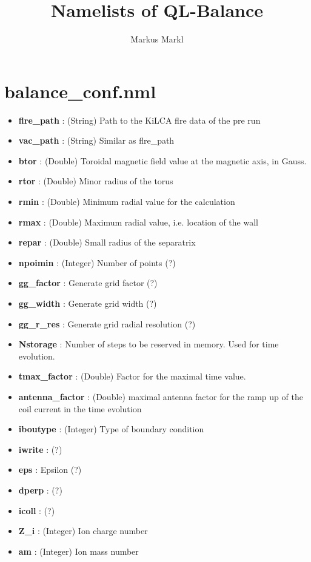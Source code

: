 \documentclass{article}
\title{Namelists of QL-Balance}
\author{Markus Markl}
\begin{document}
\maketitle

\section{balance\_conf.nml}
\begin{itemize}
	\item \textbf{flre\_path} : (String) Path to the KiLCA flre data of the pre run
	\item \textbf{vac\_path} : (String) Similar as flre\_path
	\item \textbf{btor} : (Double) Toroidal magnetic field value at the magnetic axis, in Gauss. 
	\item \textbf{rtor} : (Double) Minor radius of the torus
	\item \textbf{rmin} : (Double) Minimum radial value for the calculation
	\item \textbf{rmax} : (Double) Maximum radial value, i.e. location of the wall
	\item \textbf{repar} : (Double) Small radius of the separatrix
	\item \textbf{npoimin} : (Integer) Number of points (?)
	\item \textbf{gg\_factor} : Generate grid factor (?)
	\item \textbf{gg\_width} : Generate grid width (?)
	\item \textbf{gg\_r\_res} : Generate grid radial resolution (?)
	\item \textbf{Nstorage} : Number of steps to be reserved in memory. Used for time evolution.
	\item \textbf{tmax\_factor} : (Double) Factor for the maximal time value.
	\item \textbf{antenna\_factor} : (Double) maximal antenna factor for the ramp up of the coil current in the time evolution
	\item \textbf{iboutype} : (Integer) Type of boundary condition
	\item \textbf{iwrite} : (?)
	\item \textbf{eps} : Epsilon (?)
	\item \textbf{dperp} : (?)
	\item \textbf{icoll} : (?)
	\item \textbf{Z\_i} : (Integer) Ion charge number
	\item \textbf{am} : (Integer) Ion mass number

\end{itemize}
\end{document}

